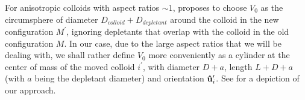 For anisotropic colloids with aspect ratios $\sim 1$, \cite{glaser2015parallel} proposes to choose $V_0$ as the circumsphere of diameter $D_{colloid} + D_{depletant}$ around the colloid in the new configuration $M^\prime$, ignoring depletants that overlap with the colloid in the old configuration $M$. In our case, due to the large aspect ratios that we will be dealing with, we shall rather define $V_0$ more conveniently as a cylinder at the center of mass of the moved colloid $i^\prime$, with diameter $D + a$, length $L + D + a$ (with $a$ being the depletant diameter) and orientation ${\bf \hat{u}}_i^\prime$. See  for a depiction of our approach.

\clearpage